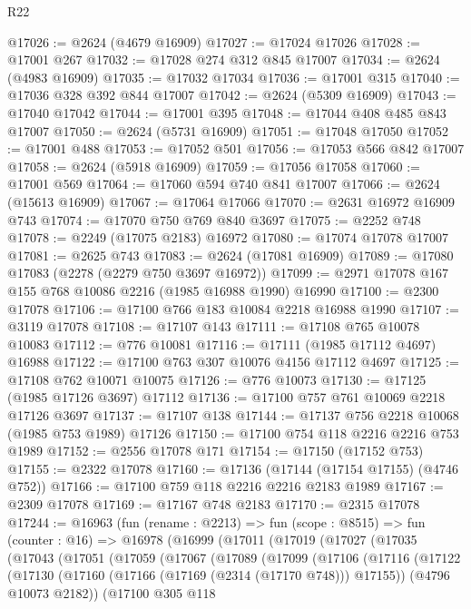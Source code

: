 \begin{lexlean}{R22}
\begin{coremodule}
@17026 := @2624 (@4679 @16909)
@17027 := @17024 @17026
@17028 := @17001 @267
@17032 := @17028 @274 @312 @845 @17007
@17034 := @2624 (@4983 @16909)
@17035 := @17032 @17034
@17036 := @17001 @315
@17040 := @17036 @328 @392 @844 @17007
@17042 := @2624 (@5309 @16909)
@17043 := @17040 @17042
@17044 := @17001 @395
@17048 := @17044 @408 @485 @843 @17007
@17050 := @2624 (@5731 @16909)
@17051 := @17048 @17050
@17052 := @17001 @488
@17053 := @17052 @501
@17056 := @17053 @566 @842 @17007
@17058 := @2624 (@5918 @16909)
@17059 := @17056 @17058
@17060 := @17001 @569
@17064 := @17060 @594 @740 @841 @17007
@17066 := @2624 (@15613 @16909)
@17067 := @17064 @17066
@17070 := @2631 @16972 @16909 @743
@17074 := @17070 @750 @769 @840 @3697
@17075 := @2252 @748
@17078 := @2249 (@17075 @2183) @16972
@17080 := @17074 @17078 @17007
@17081 := @2625 @743
@17083 := @2624 (@17081 @16909)
@17089 := @17080 @17083 (@2278 (@2279 @750 @3697 @16972))
@17099 := @2971 @17078 @167 @155 @768 @10086 @2216 (@1985 @16988 @1990) @16990
@17100 := @2300 @17078
@17106 := @17100 @766 @183 @10084 @2218 @16988 @1990
@17107 := @3119 @17078
@17108 := @17107 @143
@17111 := @17108 @765 @10078 @10083
@17112 := @776 @10081
@17116 := @17111 (@1985 @17112 @4697) @16988
@17122 := @17100 @763 @307 @10076 @4156 @17112 @4697
@17125 := @17108 @762 @10071 @10075
@17126 := @776 @10073
@17130 := @17125 (@1985 @17126 @3697) @17112
@17136 := @17100 @757 @761 @10069 @2218 @17126 @3697
@17137 := @17107 @138
@17144 := @17137 @756 @2218 @10068 (@1985 @753 @1989) @17126
@17150 := @17100 @754 @118 @2216 @2216 @753 @1989
@17152 := @2556 @17078 @171
@17154 := @17150 (@17152 @753)
@17155 := @2322 @17078
@17160 := @17136 (@17144 (@17154 @17155) (@4746 @752))
@17166 := @17100 @759 @118 @2216 @2216 @2183 @1989
@17167 := @2309 @17078
@17169 := @17167 @748 @2183
@17170 := @2315 @17078
@17244 := @16963
    (fun (rename : @2213) =>
    fun (scope : @8515) =>
    fun (counter : @16) =>
    @16978
      (@16999
        (@17011
          (@17019
            (@17027
              (@17035
                (@17043
                  (@17051
                    (@17059
                      (@17067
                        (@17089
                          (@17099
                            (@17106
                              (@17116
                                (@17122
                                  (@17130
                                    (@17160 (@17166 (@17169 (@2314 (@17170 @748))) @17155))
                                    (@4796 @10073 @2182))
                                  (@17100
                                    @305
                                    @118

\end{coremodule}
\end{lexlean}
